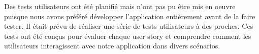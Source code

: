 Des tests utilisateurs ont été planifié mais n'ont pas pu être mis en oeuvre puisque nous avons préféré développer l'application entièrement avant de la faire tester. Il était prévu de réaliser une série de tests utilisateurs à des proches. Ces tests ont été conçus pour évaluer chaque user story et comprendre comment les utilisateurs interagissent avec notre application dans divers scénarios.

